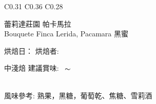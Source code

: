 \documentclass[10pt,a4paper]{article}
\begin{document}
\begin{tabular}{C{0.31\textwidth} C{0.36\textwidth} C{0.28\textwidth}}
{{\Large \hspace*{0.1em} \vspace*{0.15cm}  
\hspace*{-.5em} 蕾莉達莊園 帕卡馬拉%
}\vspace*{0.15em}\\
{\small
Bouquete Finca Lerida,  Pacamara 黑蜜%
}\vspace*{0.35em}\\
\setdatetoday \addtocounter{datenumber}{
-1%
}\setdatebynumber{\thedatenumber}
{\scriptsize 烘焙日：{\scriptsize\datedate}\hspace{0.3em}%
烘焙者: \textbf{\scriptsize{}}}\vspace*{-0.3em}\\
 \addtocounter{datenumber}{
5 }%
\setdatebynumber{\thedatenumber} 
{\normalsize 
中淺焙%
\enskip \scriptsize 建議賞味:} \scriptsize{\datemonthname ~\thedateday}$\thicksim$\addtocounter{datenumber}{55}\setdatebynumber{\thedatenumber} \datedate
\\\scriptsize 風味參考: 熟果，黑糖，葡萄乾、焦糖、雪莉酒
}
\end{tabular}
\end{document}
